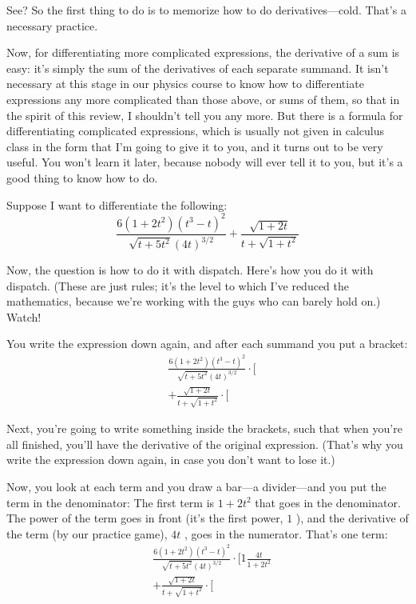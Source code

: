 \documentclass[11pt,oneside]{article}
\begin{document}
See? So the first thing to do is to memorize how to do derivatives---cold. That's a necessary practice.\par

Now, for differentiating more complicated expressions, the derivative of a sum is easy: it's simply the sum of the derivatives of each separate summand. It isn't necessary at this stage in our physics course to know how to differentiate expressions any more complicated than those above, or sums of them, so that in the spirit of this review, I shouldn't tell you any more. But there is a formula for differentiating complicated expressions, which is usually not given in calculus class in the form that I'm going to give it to you, and it turns out to be very useful. You won't learn it later, because nobody will ever tell it to you, but it's a good thing to know how to do.\par

Suppose I want to differentiate the following: 
\begin{equation*} \tag{1.3}
\label{Eq:TIPS:1:3} \frac{6(1+2t^2)(t^3-t)^2}{\sqrt{t+5t^2}(4t)^{3/2}} + \frac{\sqrt{1+2t}}{t+\sqrt{1+t^2}} \end{equation*}
\par

Now, the question is how to do it with dispatch. Here's how you do it with dispatch. (These are just rules; it's the level to which I've reduced the mathematics, because we're working with the guys who can barely hold on.) Watch!\par

You write the expression down again, and after each summand you put a bracket: 
\begin{equation*} \begin{aligned} &\frac{6(1+2t^2)(t^3-t)^2}{\sqrt{t+5t^2}(4t)^{3/2}}\cdot\Bigg[\\[.5ex] &+\frac{\sqrt{1+2t}}{t+\sqrt{1+t^2}}\cdot\Bigg[ \end{aligned} \tag{1.4}
\label{Eq:TIPS:1:4} \end{equation*}
\par

Next, you're going to write something inside the brackets, such that when you're all finished, you'll have the derivative of the original expression. (That's why you write the expression down again, in case you don't want to lose it.)\par

Now, you look at each term and you draw a bar---a divider---and you put the term in the denominator: The first term is \(1+2t^2\) that goes in the denominator. The power of the term goes in front (it's the first power, \(1\) ), and the derivative of the term (by our practice game), \(4t\) , goes in the numerator. That's one term: 
\begin{equation*} \begin{aligned} &\frac{6(1+2t^2)(t^3-t)^2}{\sqrt{t+5t^2}(4t)^{3/2}}\cdot\Bigg[1\frac{4t}{1+2t^2}\\[.5ex] &+\frac{\sqrt{1+2t}}{t+\sqrt{1+t^2}}\cdot\Bigg[ \end{aligned} \tag{1.5}
\label{Eq:TIPS:1:5} \end{equation*}
\par
\end{document}
